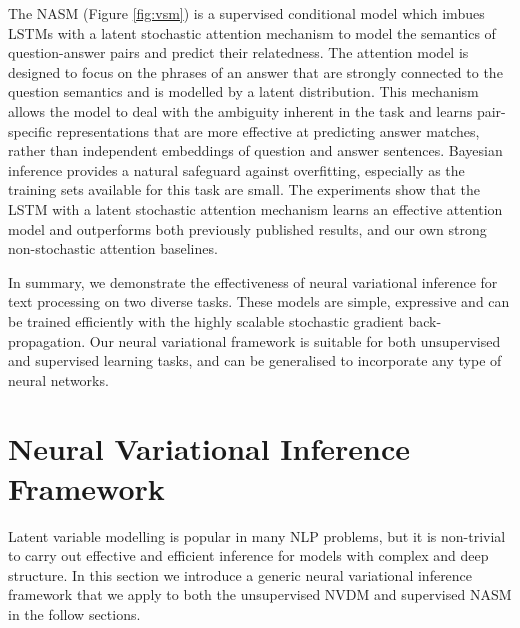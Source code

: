 \documentclass{article}
\begin{document}
The NASM (Figure \ref{fig:vsm}) is a supervised conditional model which imbues LSTMs \citep{hochreiter1997long} with a latent stochastic attention mechanism to model the semantics of question-answer pairs and predict their relatedness. 
The attention model is designed to focus on the phrases of an answer that are strongly connected to the question semantics and is modelled by a latent distribution.
This mechanism allows the model to deal with the ambiguity inherent in the task and learns pair-specific representations that are more effective at predicting answer matches, rather than independent embeddings of question and answer sentences. 
Bayesian inference provides a natural safeguard against overfitting, especially as the training sets available for this task are small.
The experiments show that the LSTM with a latent stochastic attention mechanism learns an effective attention model and outperforms both previously published results, and our own strong non-stochastic attention baselines.

In summary, we demonstrate the effectiveness of neural variational inference for text processing on two diverse tasks. These models are simple, expressive and can be trained efficiently with the highly scalable stochastic gradient back-propagation.
Our neural variational framework is suitable for both unsupervised and supervised learning tasks, and can be generalised to incorporate any type of neural networks.



\section{Neural Variational Inference Framework}
Latent variable modelling is popular in many NLP problems, but it is non-trivial to carry out effective and efficient inference for models with complex and deep structure. In this section we introduce a generic neural variational inference framework that we apply to both the unsupervised NVDM and supervised NASM in the follow sections. 
\end{document}

